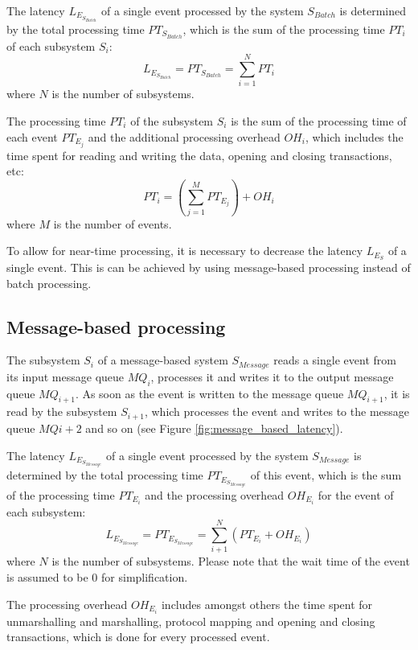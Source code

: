 The latency $L_{E_{S_{Batch}}}$ of a single event processed by the system $S_{Batch}$ is determined by the total processing time $PT_{S_{Batch}}$, which is the sum of the processing time $PT_i$ of each subsystem $S_i$:
\begin{displaymath}
L_{E_{S_{Batch}}} = PT_{S_{Batch}} = \sum_{i=1}^N PT_i
\end{displaymath}
where $N$ is the number of subsystems.

The processing time $PT_i$ of the subsystem $S_i$ is the sum of the processing time of each event $PT_{E_{j}}$ and the additional processing overhead $OH_i$, which includes the time spent for reading and writing the data, opening and closing transactions, etc:
\begin{displaymath}
PT_i = \left(\sum_{j=1}^M PT_{E_{j}}\right) + OH_i
\end{displaymath}
where $M$ is the number of events.

To allow for near-time processing, it is necessary to decrease the latency $L_{E_S}$ of a single event. This is can be achieved by using message-based processing instead of batch processing.

\subsection{Message-based processing}
The subsystem $S_i$ of a message-based system $S_{Message}$ reads a single event from its input message queue $MQ_i$, processes it and writes it to the output message queue $MQ_{i+1}$. As soon as the event is written to the message queue $MQ_{i+1}$, it is read by the subsystem $S_{i+1}$, which processes the event and writes to the message queue $MQ{i+2}$ and so on (see Figure \ref{fig:message_based_latency}).

The latency $L_{E_{S_{Message}}}$ of a single event processed by the system $S_{Message}$ is determined by the total processing time $PT_{E_{S_{Message}}}$ of this event, which is the sum of the processing time $PT_{E_i}$ and the processing overhead $OH_{E_{i}}$ for the event of each subsystem:
\begin{displaymath}
L_{E_{S_{Message}}} = PT_{E_{S_{Message}}} = \sum_{i+1}^N (PT_{E_i} + OH_{E_i})	
\end{displaymath}
where $N$ is the number of subsystems. Please note that the wait time of the event is assumed to be 0 for simplification.

The processing overhead $OH_{E_i}$ includes amongst others the time spent for unmarshalling and marshalling, protocol mapping and opening and closing transactions, which is done for every processed event.

